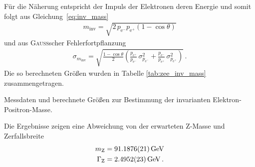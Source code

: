 \documentclass[11pt, a4paper]{article}
\numberwithin{equation}{section}
\begin{document}
Für die Näherung entspricht der Impuls der Elektronen deren Energie und somit folgt aus Gleichung~\eqref{eq:inv_mass}
\begin{align*}
	m_\mathrm{inv} = \sqrt{2 \, p_{\mathrm{e}^-} p_{\mathrm{e}^+} (1 - \cos\theta)}
\end{align*}
und aus \textsc{Gauß}scher Fehlerfortpflanzung
\begin{align*}
	\sigma_{m_\mathrm{inv}} = \sqrt{\frac{1 - \cos\theta}{2} \left( \frac{p_{\mathrm{e}^+}}{p_{\mathrm{e}^-}} \, \sigma_{p_{\mathrm{e}^-}}^2 + \frac{p_{\mathrm{e}^-}}{p_{\mathrm{e}^+}}  \, \sigma_{p_{\mathrm{e}^+}}^2\right)} \, \text{.}
\end{align*}
Die so berechneten Größen wurden in Tabelle \ref{tab:zee_inv_mass} zusammengetragen.
\begin{table}
	\centering
	\begin{subtable}{0.585\textheight}
		
		\vspace{0.6cm}
	\end{subtable}
	
	\begin{subtable}{0.585\textheight}
		
		\vspace{0.6cm}
	\end{subtable}
	
	\begin{subtable}{0.585\textheight}
		
	\end{subtable}
	
	\caption{Messdaten und berechnete Größen zur Bestimmung der invarianten Elektron-Positron-Masse.}
	\label{tab:zee_inv_mass}
\end{table}
Die Ergebnisse zeigen eine Abweichung von der erwarteten $\mathrm{Z}$-Masse und Zerfallsbreite \cite{pdg}
\begin{align*}
	m_\mathrm{Z} &= \SI{91.1876 +- 0.0021}{\GeV} \\
	\Gamma_\mathrm{Z} &= \SI{2.4952 +- 0.0023}{\GeV} \, \text{.}
\end{align*}
\end{document}

